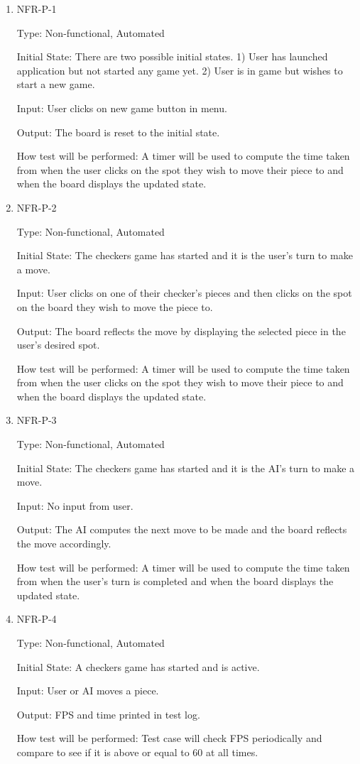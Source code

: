\documentclass[12pt, titlepage]{article}
\begin{document}
\begin{enumerate}

\item{NFR-P-1\\}

Type: Non-functional, Automated
					
Initial State: There are two possible initial states. 1) User has launched application but not started any game yet. 2) User is in game but wishes to start a new game.
					
Input: User clicks on new game button in menu.
					
Output: The board is reset to the initial state.
					
How test will be performed: A timer will be used to compute the time taken from when the user clicks on the spot they wish to move their piece to and when the board displays the updated state.

\item{NFR-P-2\\}

Type: Non-functional, Automated
					
Initial State: The checkers game has started and it is the user's turn to make a move.
					
Input: User clicks on one of their checker's pieces and then clicks on the spot on the board they wish to move the piece to. 
					
Output: The board reflects the move by displaying the selected piece in the user's desired spot.
					
How test will be performed: A timer will be used to compute the time taken from when the user clicks on the spot they wish to move their piece to and when the board displays the updated state.

\item{NFR-P-3\\}

Type: Non-functional, Automated
					
Initial State: The checkers game has started and it is the AI's turn to make a move.
					
Input: No input from user.
					
Output: The AI computes the next move to be made and the board reflects the move accordingly.
					
How test will be performed: A timer will be used to compute the time taken from when the user's turn is completed and when the board displays the updated state.

\item{NFR-P-4\\}

Type: Non-functional, Automated
					
Initial State: A checkers game has started and is active.
					
Input: User or AI moves a piece.
					
Output: FPS and time printed in test log.
					
How test will be performed: Test case will check FPS periodically and compare to see if it is above or equal to 60 at all times.

\end{enumerate}
\end{document}
